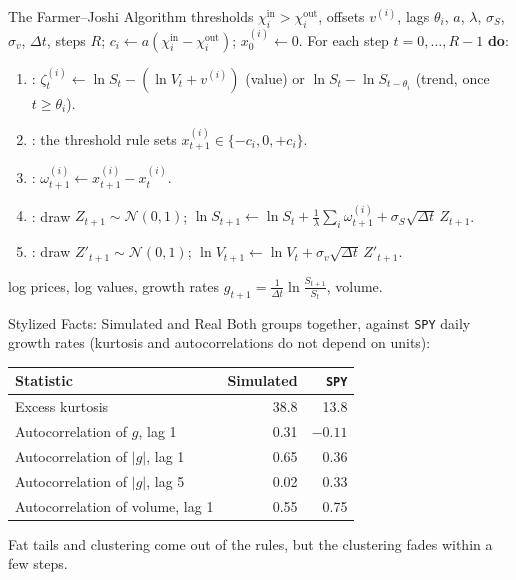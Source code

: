 \documentclass[aspectratio=169,11pt]{beamer}
\newcommand{\cin}{\chi^{\text{in}}_{i}}
\newcommand{\cout}{\chi^{\text{out}}_{i}}
\begin{document}
\begin{frame}{The Farmer–Joshi Algorithm}
  \small
  \textbf{} thresholds $\cin>\cout$, offsets $v^{(i)}$, lags $\theta_{i}$, $a$,
  $\lambda$, $\sigma_{S}$, $\sigma_{v}$, $\Delta t$, steps $R$; $c_{i}\gets a(\cin-\cout)$;
  $x^{(i)}_{0}\gets 0$. For each step $t=0,\dots,R-1$ \textbf{do}:
  \begin{enumerate}\setlength{\itemsep}{0.15em}
    \item {}: $\zeta^{(i)}_{t}\gets\ln S_{t}-(\ln V_{t}+v^{(i)})$ (value) or
      $\ln S_{t}-\ln S_{t-\theta_{i}}$ (trend, once $t\geq\theta_{i}$).
    \item {}: the threshold rule sets $x^{(i)}_{t+1}\in\{-c_{i},0,+c_{i}\}$.
    \item {}: $\omega^{(i)}_{t+1}\gets x^{(i)}_{t+1}-x^{(i)}_{t}$.
    \item {}: draw $Z_{t+1}\sim\mathcal{N}(0,1)$; $\ln S_{t+1}\gets\ln S_{t}+\frac{1}{\lambda}\sum_{i}\omega^{(i)}_{t+1}+\sigma_{S}\sqrt{\Delta t}\,Z_{t+1}$.
    \item {}: draw $Z'_{t+1}\sim\mathcal{N}(0,1)$; $\ln V_{t+1}\gets \ln V_{t}+\sigma_{v}\sqrt{\Delta t}\,Z'_{t+1}$.
  \end{enumerate}
  \textbf{} log prices, log values, growth rates $g_{t+1}=\frac{1}{\Delta t}\ln\frac{S_{t+1}}{S_{t}}$, volume.
\end{frame}

\begin{frame}{Stylized Facts: Simulated and Real}
  Both groups together, against \texttt{SPY} daily growth rates
  (kurtosis and autocorrelations do not depend on units):
  \begin{center}\small
    \begin{tabular}{lrr}
      \toprule
      Statistic & Simulated & \texttt{SPY} \\
      \midrule
      Excess kurtosis & 38.8 & 13.8 \\
      Autocorrelation of $g$, lag 1 & 0.31 & $-0.11$ \\
      Autocorrelation of $\lvert g\rvert$, lag 1 & 0.65 & 0.36 \\
      Autocorrelation of $\lvert g\rvert$, lag 5 & 0.02 & 0.33 \\
      Autocorrelation of volume, lag 1 & 0.55 & 0.75 \\
      \bottomrule
    \end{tabular}
  \end{center}
  Fat tails and clustering come out of the rules, but the clustering fades within
  a few steps.
\end{frame}
\end{document}
